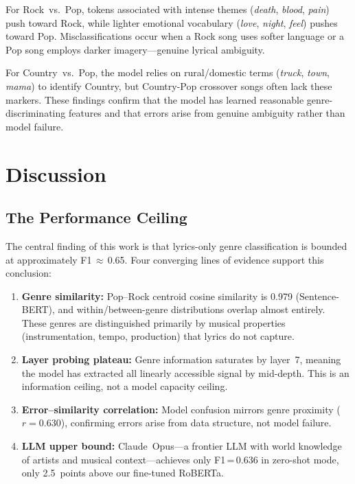 \documentclass[11pt,a4paper]{article}
\begin{document}
For Rock~vs.~Pop, tokens associated with intense themes
(\emph{death}, \emph{blood}, \emph{pain}) push toward Rock, while
lighter emotional vocabulary (\emph{love}, \emph{night}, \emph{feel})
pushes toward Pop.
Misclassifications occur when a Rock song uses softer language or a
Pop song employs darker imagery---genuine lyrical ambiguity.

For Country~vs.~Pop, the model relies on rural/domestic terms
(\emph{truck}, \emph{town}, \emph{mama}) to identify Country, but
Country-Pop crossover songs often lack these markers.
These findings confirm that the model has learned reasonable
genre-discriminating features and that errors arise from genuine
ambiguity rather than model failure.


\section{Discussion}
\label{sec:discussion}

\subsection{The Performance Ceiling}
\label{sec:ceiling}

The central finding of this work is that lyrics-only genre
classification is bounded at approximately F1\,$\approx$\,0.65.
Four converging lines of evidence support this conclusion:

\begin{enumerate}[leftmargin=*,itemsep=2pt]
\item \textbf{Genre similarity:} Pop--Rock centroid cosine similarity
  is 0.979 (Sentence-BERT), and within/between-genre distributions
  overlap almost entirely.
  These genres are distinguished primarily by musical properties
  (instrumentation, tempo, production) that lyrics do not capture.
\item \textbf{Layer probing plateau:} Genre information saturates by
  layer~7, meaning the model has extracted all linearly accessible
  signal by mid-depth.
  This is an information ceiling, not a model capacity ceiling.
\item \textbf{Error--similarity correlation:} Model confusion mirrors
  genre proximity ($r = 0.630$), confirming errors arise from data
  structure, not model failure.
\item \textbf{LLM upper bound:} Claude~Opus---a frontier LLM with
  world knowledge of artists and musical context---achieves only
  F1\,=\,0.636 in zero-shot mode, only 2.5~points above our
  fine-tuned RoBERTa.
\end{enumerate}
\end{document}
